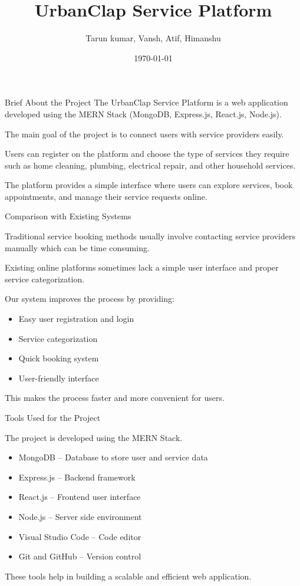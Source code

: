 \documentclass{beamer}
\title{UrbanClap Service Platform}
\author{Tarun kumar, Vansh, Atif, Himanshu}
\institute{MERN Stack Project}
\date{\today}
\begin{document}
\begin{frame}
\titlepage
\end{frame}

\begin{frame}{Brief About the Project}
The UrbanClap Service Platform is a web application developed using the MERN Stack (MongoDB, Express.js, React.js, Node.js).

The main goal of the project is to connect users with service providers easily.

Users can register on the platform and choose the type of services they require such as home cleaning, plumbing, electrical repair, and other household services.

The platform provides a simple interface where users can explore services, book appointments, and manage their service requests online.
\end{frame}

\begin{frame}{Comparison with Existing Systems}

Traditional service booking methods usually involve contacting service providers manually which can be time consuming.

Existing online platforms sometimes lack a simple user interface and proper service categorization.

Our system improves the process by providing:
\begin{itemize}
\item Easy user registration and login
\item Service categorization
\item Quick booking system
\item User-friendly interface
\end{itemize}

This makes the process faster and more convenient for users.
\end{frame}

\begin{frame}{Tools Used for the Project}

The project is developed using the MERN Stack.

\begin{itemize}
\item MongoDB – Database to store user and service data
\item Express.js – Backend framework
\item React.js – Frontend user interface
\item Node.js – Server side environment
\item Visual Studio Code – Code editor
\item Git and GitHub – Version control
\end{itemize}

These tools help in building a scalable and efficient web application.
\end{frame}
\end{document}
